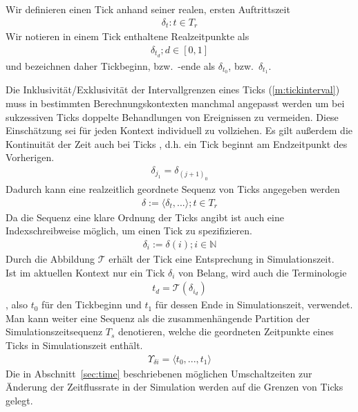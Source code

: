 Wir definieren einen Tick anhand seiner realen, ersten Auftrittszeit
\begin{align}
\delta_t: t \in T_r
\end{align}
Wir notieren in einem Tick enthaltene Realzeitpunkte als
\begin{align}\label{m:tickinterval}
\delta_{t_d}; d \in [0,1]
\end{align}
und bezeichnen daher Tickbeginn, bzw.~-ende als $\delta_{t_0}$, bzw.~$\delta_{t_1}$. 

Die Inklusivität/Exklusivität der Intervallgrenzen eines Ticks (\ref{m:tickinterval}) muss in bestimmten Berechnungskontexten manchmal angepasst werden um bei sukzessiven Ticks doppelte Behandlungen von Ereignissen zu vermeiden. Diese Einschätzung sei für jeden Kontext individuell zu vollziehen.
Es gilt außerdem die Kontinuität der Zeit auch bei Ticks , d.h. ein Tick beginnt am Endzeitpunkt des Vorherigen.
\begin{align}
	\delta_{j_1} = \delta_{(j+1)_0}\label{m:tick_continuity}
\end{align}
Dadurch kann eine realzeitlich geordnete Sequenz von Ticks angegeben werden
\begin{align}
	\delta := \langle \delta_t, ... \rangle ; t \in T_r
\end{align}
Da die Sequenz eine klare Ordnung der Ticks angibt ist auch eine Indexschreibweise möglich, um einen Tick zu spezifizieren.
\begin{align}
	\delta_i := \delta(i); i \in \mathbb{N}
\end{align}
Durch die Abbildung $\mathcal{T}$ erhält der Tick eine Entsprechung in Simulationszeit.\\
Ist im aktuellen Kontext nur ein Tick $\delta_i$ von Belang, wird auch die Terminologie 
\begin{align}
t_d = \mathcal{T}(\delta_{i_d})
\end{align}
, also $t_0$ für den Tickbeginn und $t_1$ für dessen Ende in Simulationszeit, verwendet.\\
Man kann weiter eine Sequenz als die zusammenhängende Partition der Simulationszeitsequenz $T_s$ denotieren, welche die geordneten Zeitpunkte eines Ticks in Simulationszeit enthält.
\begin{align}
\Upsilon_{\delta i} = \langle t_0, ...,  t_1\rangle
\end{align}
Die in Abschnitt~\ref{sec:time} beschriebenen möglichen Umschaltzeiten zur Änderung der Zeitflussrate in der Simulation werden auf die Grenzen von Ticks gelegt.\\
